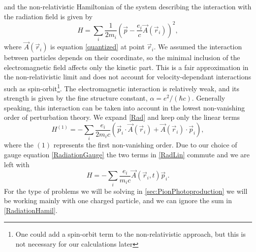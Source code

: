 and the non-relativistic Hamiltonian of the system describing the interaction with the radiation field is given by
\begin{equation} \label{Rad}
	H = \sum_i \frac{1}{2m_i}\left( \vec{p}-\frac{e_i}{c}\vec{A}(\vec{r}_i)\right)^2,
\end{equation}
where $\vec{A}(\vec{r}_i)$ is equation \eqref{quantized} at point $\vec{r}_i$. We assumed the interaction between particles depends on their coordinate, so the minimal inclusion of the electromagnetic field affects only the kinetic part. This is a fair approximation in the non-relativistic limit and does not account for velocity-dependant interactions such as spin-orbit\footnote{One could add a spin-orbit term to the non-relativistic approach, but this is not necessary for our calculations later}. 
The electromagnetic interaction is relatively weak, and its strength is given by the fine structure constant, $\alpha = e^2/(\hbar c)$. Generally speaking, this interaction can be taken into account in the lowest non-vanishing order of perturbation theory. We expand \eqref{Rad} and keep only the linear terms
\begin{equation} \label{RadLin}
	H^{(1)} = -\sum_i \frac{e_i}{2m_i c} (\vec{p}_i\cdot \vec{A}(\vec{r}_i)+\vec{A}(\vec{r}_i)\cdot \vec{p}_i),
\end{equation}
where the $(1)$ represents the first non-vanishing order. Due to our choice of gauge equation \eqref{RadiationGauge} the two terms in \eqref{RadLin} commute and we are left with
\begin{equation} \label{RadiationHamil}
	H = - \sum_i \frac{e_i}{m_i c} \vec{A}(\vec{r}_i,t)\vec{p}_i.
\end{equation}
For the type of problems we will be solving in \ref{sec:PionPhotoproduction} we will be working mainly with one charged particle, and we can ignore the sum in \eqref{RadiationHamil}.
